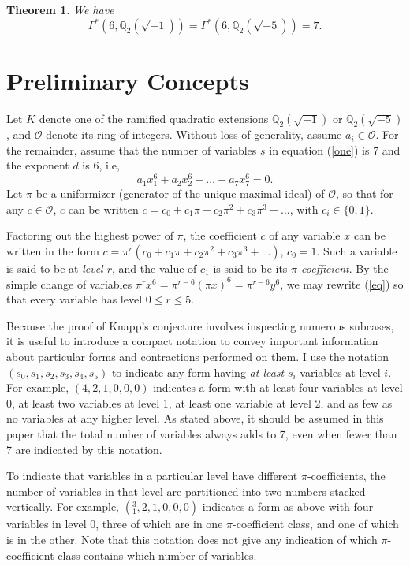 \documentclass[draft]{publmathdeb}
\newtheorem{theorem}{Theorem}
\begin{document}
\begin{theorem}
We have $$\Gamma^*(6, \mathbb{Q}_2(\sqrt{-1})) = \Gamma^*(6, \mathbb{Q}_2(\sqrt{-5})) = 7. $$
\end{theorem}

\section{Preliminary Concepts}

Let $K$ denote one of the ramified quadratic extensions $\mathbb{Q}_2(\sqrt{-1})$ or $\mathbb{Q}_2(\sqrt{-5})$, and $\mathcal{O}$ denote its ring of integers.  Without loss of generality, assume $a_i \in \mathcal{O}$.  For the remainder, assume that the number of variables $s$ in equation (\ref{one}) is 7 and the exponent $d$ is 6, i.e,
\begin{equation}
\label{eq}
a_1x_1^6 + a_2x_2^6 + \ldots + a_7x_7^6 = 0.
\end{equation}
Let $\pi$ be a uniformizer (generator of the unique maximal ideal) of $\mathcal{O}$, so that for any $c \in \mathcal{O}$, $c$ can be written $c = c_0 + c_1\pi + c_2\pi^2 + c_3\pi^3 + \ldots$, with $c_i \in \{0,1\}$.

Factoring out the highest power of $\pi$, the coefficient $c$ of any variable $x$ can be written in the form $c = \pi^r(c_0 + c_1\pi + c_2\pi^2 + c_3\pi^3 + \ldots)$, $c_0 = 1$.  Such a variable is said to be at \textit{level $r$}, and the value of $c_1$ is said to be its \textit{$\pi$-coefficient}.  By the simple change of variables $\pi^r x^6 = \pi^{r-6}(\pi x)^6 = \pi^{r-6}y^6$, we may rewrite (\ref{eq}) so that every variable has level $0 \le r \le 5$.

Because the proof of Knapp's conjecture involves inspecting numerous subcases, it is useful to introduce a compact notation to convey important information about particular forms and contractions performed on them.  I use the notation $(s_0, s_1, s_2, s_3, s_4, s_5)$ to indicate any form having \textit{at least} $s_i$ variables at level $i$.  For example, $(4, 2, 1, 0, 0, 0)$ indicates a form with at least four variables at level 0, at least two variables at level 1, at least one variable at level 2, and as few as no variables at any higher level.  As stated above, it should be assumed in this paper that the total number of variables always adds to 7, even when fewer than 7 are indicated by this notation.

To indicate that variables in a particular level have different $\pi$-coefficients, the number of variables in that level are partitioned into two numbers stacked vertically.  For example, $(^3_1, 2, 1, 0, 0, 0)$ indicates a form as above with four variables in level 0, three of which are in one $\pi$-coefficient class, and one of which is in the other.  Note that this notation does not give any indication of which $\pi$-coefficient class contains which number of variables.
\end{document}
